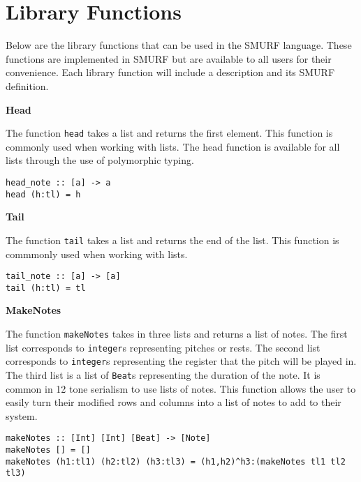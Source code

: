\section{Library Functions}

Below are the library functions that can be used in the SMURF language. 
These functions are implemented in SMURF but are available to all users 
for their convenience. Each library function will include a description 
and its SMURF definition. \newline

\noindent\textbf{Head}

The function \texttt{head} takes a list and returns the first element. 
This function is commonly used when working with lists. The head function
is available for all lists through the use of polymorphic typing. 

\begin{verbatim}
head_note :: [a] -> a
head (h:tl) = h
\end{verbatim} 


\noindent\textbf{Tail}

The function \texttt{tail} takes a list and returns the end of the list.
This function is commmonly used when working with lists. 

\begin{verbatim}
tail_note :: [a] -> [a]
tail (h:tl) = tl
\end{verbatim} 


\noindent\textbf{MakeNotes}

The function \texttt{makeNotes} takes in three lists and returns a list 
of notes. The first list corresponds to \texttt{integer}s representing 
pitches or rests. The second list corresponds to \texttt{integer}s representing the register that the pitch will be played in. The third list is a list 
of \texttt{Beat}s representing the duration of the note. It is common in 
12 tone serialism to use lists of notes. This function allows the user 
to easily turn their modified rows and columns into a list of notes to add 
to their system. 

\begin{verbatim}
makeNotes :: [Int] [Int] [Beat] -> [Note]
makeNotes [] = []
makeNotes (h1:tl1) (h2:tl2) (h3:tl3) = (h1,h2)^h3:(makeNotes tl1 tl2 tl3)
\end{verbatim}
